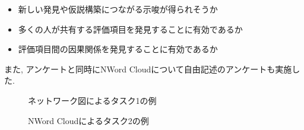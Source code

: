 \documentclass[syuuron]{kuee}
\begin{document}
		\begin{itemize}
			\item 新しい発見や仮説構築につながる示唆が得られそうか
			\item 多くの人が共有する評価項目を発見することに有効であるか
			\item 評価項目間の因果関係を発見することに有効であるか
		\end{itemize}
		また, アンケートと同時にNWord Cloudについて自由記述のアンケートも実施した. 
		
		\begin{figure}
			\begin{center}
			\end{center}
			\caption{ネットワーク図によるタスク1の例}
	  		\label{fig:que1}
		\end{figure}
		\begin{figure}
			\begin{center}
			\end{center}
			\caption{NWord Cloudによるタスク2の例}
	  		\label{fig:que2}
		\end{figure}
\end{document}
